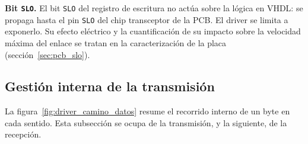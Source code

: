 \textbf{Bit \texttt{SLO}.} El bit \texttt{SLO} del registro de escritura no actúa sobre la lógica en
VHDL: se propaga hasta el pin \texttt{SLO} del chip transceptor de la PCB. El driver se limita a
exponerlo. Su efecto eléctrico y la cuantificación de su impacto sobre la velocidad máxima del
enlace se tratan en la caracterización de la placa (sección~\ref{sec:pcb_slo}).

\subsection{Gestión interna de la transmisión}

La figura~\ref{fig:driver_camino_datos} resume el recorrido interno de un byte en cada sentido.
Esta subsección se ocupa de la transmisión, y la siguiente, de la recepción.

